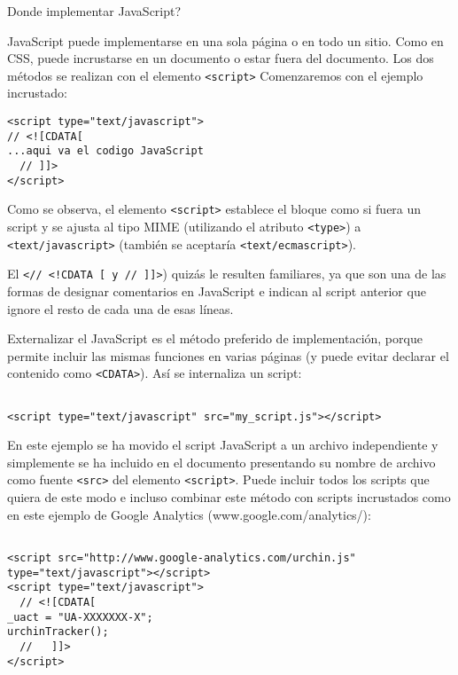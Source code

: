 \begin{frame}{Donde implementar JavaScript?} %

    JavaScript puede implementarse en una sola página o en todo un sitio. Como
    en CSS, puede incrustarse en un documento o estar fuera del documento. Los
    dos métodos se realizan con el elemento \texttt{<script>}
    Comenzaremos con el ejemplo incrustado:

        \begin{lstlisting}
<script type="text/javascript">
// <![CDATA[
...aqui va el codigo JavaScript
  // ]]>
</script>
        \end{lstlisting}

    Como se observa, el elemento \texttt{<script>} establece el bloque como si
    fuera un script y se ajusta al tipo MIME (utilizando el atributo
    \texttt{<type>}) a \texttt{<text/javascript>} (también se aceptaría
    \texttt{<text/ecmascript>}).

    El  \texttt{<// <!CDATA [ y // ]]>}) quizás le resulten familiares, ya que
    son una de las formas de designar comentarios en JavaScript e indican al
    script anterior que ignore el resto de cada una de esas líneas.

    Externalizar el JavaScript es el método preferido de implementación, porque
    permite incluir las mismas funciones en varias páginas (y puede evitar
    declarar el contenido como \texttt{<CDATA>}). Así se internaliza un
    script:

    \begin{lstlisting}

<script type="text/javascript" src="my_script.js"></script>

    \end{lstlisting}

    En este ejemplo se ha movido el script JavaScript a un archivo
    independiente y simplemente se ha incluido en el documento presentando su
    nombre de archivo como fuente \texttt{<src>} del elemento
    \texttt{<script>}. Puede incluir todos los scripts que quiera de este
    modo e incluso combinar este método con scripts incrustados como en este
    ejemplo de Google Analytics (www.google.com/analytics/):

    \begin{lstlisting}

<script src="http://www.google-analytics.com/urchin.js" type="text/javascript"></script>
<script type="text/javascript">
  // <![CDATA[
_uact = "UA-XXXXXXX-X";
urchinTracker();
  //   ]]>
</script>
    \end{lstlisting}


\end{frame}
